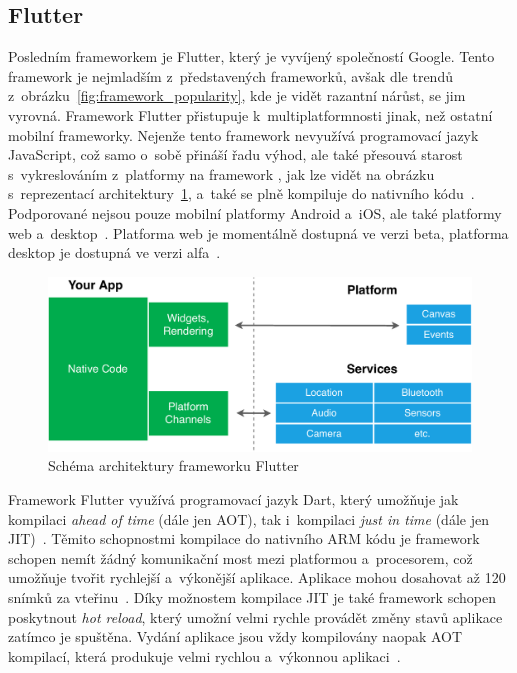 \subsection{Flutter}

Posledním frameworkem je Flutter,
který je vyvíjený společností Google.
\linebreak Tento framework je nejmladším z~představených frameworků,
\linebreak avšak dle trendů z~obrázku~\ref{fig:framework_popularity},
kde je vidět razantní nárůst,
se jim vyrovná.
\linebreak Framework Flutter přistupuje k~multiplatformnosti jinak,
než ostatní mobilní frameworky.
Nejenže tento framework nevyužívá programovací jazyk JavaScript,
což samo o~sobě přináší řadu výhod,
ale také přesouvá starost s~vykreslováním z~platformy na framework
\cite{hackernoon_flutter},
jak lze vidět na obrázku \linebreak s~reprezentací
architektury~\ref{fig:framework_flutter},
a~také se plně kompiluje do nativního
kódu~\cite{dashmagazine_mobile_frameworks}.
Podporované nejsou pouze mobilní platformy Android a~iOS,
ale také platformy web a~desktop~\cite{flutter}.
Platforma web je momentálně dostupná ve verzi beta,
platforma desktop je dostupná ve verzi alfa~\cite{flutter_web, flutter_desktop}.

\begin{figure}
    \centering
    \includegraphics[width=\linewidth]{assets/technology-research/framework/flutter.pdf}
    \caption{Schéma architektury frameworku Flutter~\cite{hackernoon_flutter}}
    \label{fig:framework_flutter}
\end{figure}

Framework Flutter využívá programovací jazyk Dart,
který umožňuje jak kompilaci \emph{ahead of time} (dále jen AOT),
tak i~kompilaci \emph{just in time} (dále jen JIT)~\cite{hackernoon_flutter}.
Těmito schopnostmi kompilace do nativního ARM kódu je framework schopen
nemít žádný komunikační most mezi platformou a~procesorem,
což umožňuje tvořit rychlejší
a~výkonější aplikace.
Aplikace mohou dosahovat až 120 snímků
za vteřinu~\cite{dashmagazine_mobile_frameworks}.
Díky možnostem kompilace JIT je také framework schopen poskytnout
\emph{hot reload},
který umožní velmi rychle provádět změny stavů aplikace zatímco
je spuštěna.
Vydání aplikace jsou vždy kompilovány naopak AOT kompilací,
která produkuje velmi rychlou a~výkonnou aplikaci~\cite{hackernoon_flutter}.

